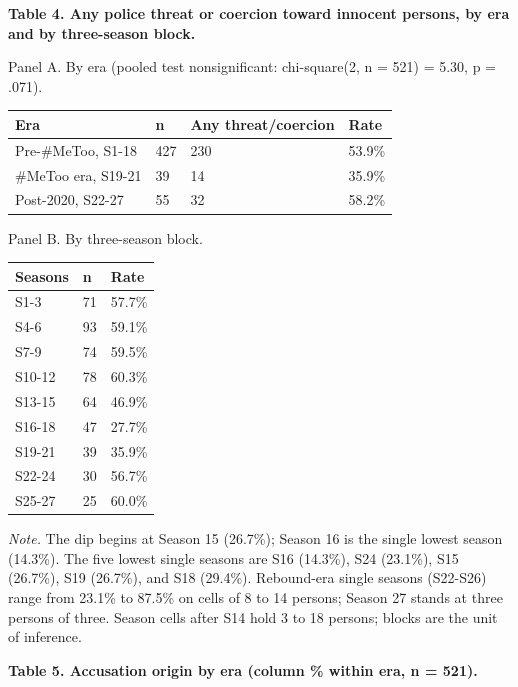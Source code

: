 \documentclass[
]{article}
\newcounter{none} %
\begin{document}
\textbf{Table 4. Any police threat or coercion toward innocent persons,
by era and by three-season block.}

Panel A. By era (pooled test nonsignificant: chi-square(2, n = 521) =
5.30, p = .071).

{\def\LTcaptype{none} %
\begin{longtable}[]{@{}llll@{}}
\toprule\noalign{}
Era & n & Any threat/coercion & Rate \\
\midrule\noalign{}
\endhead
\bottomrule\noalign{}
\endlastfoot
Pre-\#MeToo, S1-18 & 427 & 230 & 53.9\% \\
\#MeToo era, S19-21 & 39 & 14 & 35.9\% \\
Post-2020, S22-27 & 55 & 32 & 58.2\% \\
\end{longtable}
}

Panel B. By three-season block.

{\def\LTcaptype{none} %
\begin{longtable}[]{@{}lll@{}}
\toprule\noalign{}
Seasons & n & Rate \\
\midrule\noalign{}
\endhead
\bottomrule\noalign{}
\endlastfoot
S1-3 & 71 & 57.7\% \\
S4-6 & 93 & 59.1\% \\
S7-9 & 74 & 59.5\% \\
S10-12 & 78 & 60.3\% \\
S13-15 & 64 & 46.9\% \\
S16-18 & 47 & 27.7\% \\
S19-21 & 39 & 35.9\% \\
S22-24 & 30 & 56.7\% \\
S25-27 & 25 & 60.0\% \\
\end{longtable}
}

\emph{Note.} The dip begins at Season 15 (26.7\%); Season 16 is the
single lowest season (14.3\%). The five lowest single seasons are S16
(14.3\%), S24 (23.1\%), S15 (26.7\%), S19 (26.7\%), and S18 (29.4\%).
Rebound-era single seasons (S22-S26) range from 23.1\% to 87.5\% on
cells of 8 to 14 persons; Season 27 stands at three persons of three.
Season cells after S14 hold 3 to 18 persons; blocks are the unit of
inference.

\textbf{Table 5. Accusation origin by era (column \% within era, n =
521).}
\end{document}
